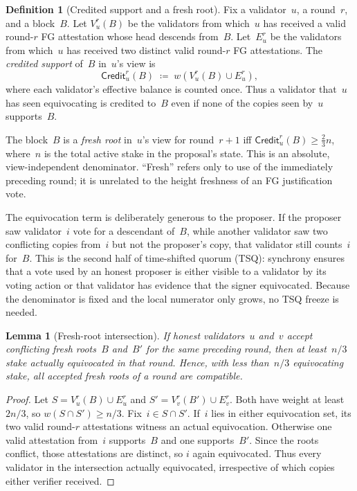 \ifx\litemode\undefined\documentclass{article}\fi
\newcommand{\Credit}{\ensuremath{\mathsf{Credit}}} %
\theoremstyle{plain}
\newtheorem{lemma}{Lemma}
\theoremstyle{definition}
\newtheorem{definition}{Definition}
\theoremstyle{remark}
\begin{document}
\begin{definition}[Credited support and a fresh root]\label{def:fresh-quorum}
Fix a validator~$u$, a round~$r$, and a block~$B$.  Let
\(V_u^r(B)\) be the validators from which~$u$ has received a valid round-$r$
FG attestation whose head descends from~$B$.  Let~\(E_u^r\) be the validators
from which~$u$ has received two distinct valid round-$r$ FG attestations.  The
\emph{credited support} of~$B$ in~$u$'s view is
\[
  \Credit_u^r(B) \;\coloneqq\; w\!\left(V_u^r(B) \cup E_u^r\right),
\]
where each validator's effective balance is counted once.  Thus a validator
that~$u$ has seen equivocating is credited to~$B$ even if none of the copies
seen by~$u$ supports~$B$.

The block~$B$ is a \emph{fresh root} in~$u$'s view for round~$r+1$ iff
\(\Credit_u^r(B) \geq \tfrac23 n\), where~$n$ is the total active stake in
the proposal's state.  This is an absolute, view-independent denominator.
``Fresh'' refers only to use of the immediately preceding round; it is
unrelated to the height freshness of an FG justification vote.
\end{definition}

The equivocation term is deliberately generous to the proposer.  If the
proposer saw validator~$i$ vote for a descendant of~$B$, while another
validator saw two conflicting copies from~$i$ but not the proposer's copy,
that validator still counts~$i$ for~$B$.  This is the second half of
time-shifted quorum (TSQ): synchrony ensures that a vote used by an honest
proposer is either visible to a validator by its voting action or that
validator has evidence that the signer equivocated.  Because the denominator
is fixed and the local numerator only grows, no TSQ freeze is needed.

\begin{lemma}[Fresh-root intersection]\label{lem:quorum-intersection-sg}
If honest validators~$u$ and~$v$ accept conflicting fresh roots~$B$ and~$B'$ for
the same preceding round, then at least~$n/3$ stake actually equivocated in
that round.  Hence, with less than~$n/3$ equivocating stake, all accepted fresh
roots of a round are compatible.
\end{lemma}

\begin{proof}
Let \(S=V_u^r(B)\cup E_u^r\) and
\(S'=V_v^r(B')\cup E_v^r\).  Both have weight at least~$2n/3$, so
\(w(S\cap S')\geq n/3\).  Fix~$i\in S\cap S'$.  If~$i$ lies in either
equivocation set, its two valid round-$r$ attestations witness an actual
equivocation.  Otherwise one valid attestation from~$i$ supports~$B$ and one
supports~$B'$.  Since the roots conflict, those attestations are distinct, so
$i$ again equivocated.  Thus every validator in the intersection actually
equivocated, irrespective of which copies either verifier received.
\end{proof}
\end{document}
